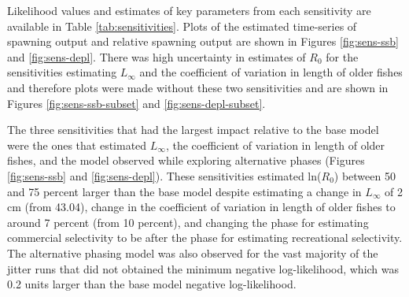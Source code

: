\documentclass[11pt,
  english,
  a4paper,
]{article}
\begin{document}
\leavevmode\tagmcend\tagstructend\par


Likelihood values and estimates of key parameters from each sensitivity are available in Table \ref{tab:sensitivities}. Plots of the estimated time-series of spawning output and relative spawning output are shown in Figures \ref{fig:sens-ssb} and \ref{fig:sens-depl}. There was high uncertainty in estimates of {\(R_0\)\leavevmode\tagmcend\tagstructend} for the sensitivities estimating {\(L_{\infty}\)\leavevmode\tagmcend\tagstructend} and the coefficient of variation in length of older fishes and therefore plots were made without these two sensitivities and are shown in Figures \ref{fig:sens-ssb-subset} and \ref{fig:sens-depl-subset}.

\leavevmode\tagmcend\tagstructend\par


The three sensitivities that had the largest impact relative to the base model were the ones that estimated {\(L_{\infty}\)\leavevmode\tagmcend\tagstructend}, the coefficient of variation in length of older fishes, and the model observed while exploring alternative phases (Figures \ref{fig:sens-ssb} and \ref{fig:sens-depl}). These sensitivities estimated ln({\(R_0\)\leavevmode\tagmcend\tagstructend}) between 50 and 75 percent larger than the base model despite estimating a change in {\(L_{\infty}\)\leavevmode\tagmcend\tagstructend} of 2 cm (from 43.04), change in the coefficient of variation in length of older fishes to around 7 percent (from 10 percent), and changing the phase for estimating commercial selectivity to be after the phase for estimating recreational selectivity. The alternative phasing model was also observed for the vast majority of the jitter runs that did not obtained the minimum negative log-likelihood, which was 0.2 units larger than the base model negative log-likelihood.

\leavevmode\tagmcend\tagstructend\par

\end{document}
